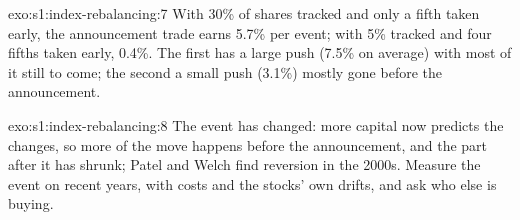 \begin{solution}{exo:s1:index-rebalancing:7}
With 30\% of shares tracked and only a fifth taken early, the announcement trade earns 5.7\% per event; with 5\% tracked and four fifths taken early, 0.4\%.
The first has a large push (7.5\% on average) with most of it still to come; the second a small push (3.1\%) mostly gone before the announcement.
\end{solution}

\begin{solution}{exo:s1:index-rebalancing:8}
The event has changed: more capital now predicts the changes, so more of the move happens before the announcement, and the part after it has shrunk;
Patel and Welch find reversion in the 2000s. Measure the event on recent years, with costs and the stocks' own drifts, and ask who else is buying.
\end{solution}

